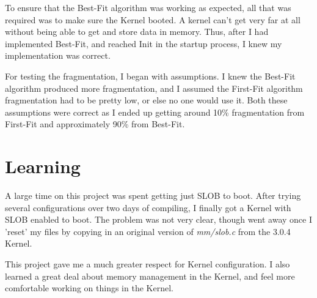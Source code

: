 \documentclass[letterpaper,10pt,titlepage]{article}
\begin{document}
To ensure that the Best-Fit algorithm was working as expected, all that
was required was to make sure the Kernel booted. A kernel can't get very
far at all without being able to get and store data in memory.
Thus, after I had implemented Best-Fit, and reached Init in the startup
process, I knew my implementation was correct. 

For testing the fragmentation, I began with assumptions. I knew the
Best-Fit algorithm produced more fragmentation, and I assumed the
First-Fit algorithm fragmentation had to be pretty low, or else no one
would use it. Both these assumptions were correct as I ended up getting
around 10\% fragmentation from First-Fit and approximately 90\% from
Best-Fit.

\section*{Learning}


A large time on this project was spent getting just SLOB to boot. After
trying several configurations over two days of compiling, I finally got
a Kernel with SLOB enabled to boot. The problem was not very clear,
though went away once I 'reset' my files by copying in an original
version of \emph{mm/slob.c} from the 3.0.4 Kernel.

This project gave me a much greater respect for Kernel configuration. I
also learned a great deal about memory management in the Kernel, and
feel more comfortable working on things in the Kernel.
\end{document}
